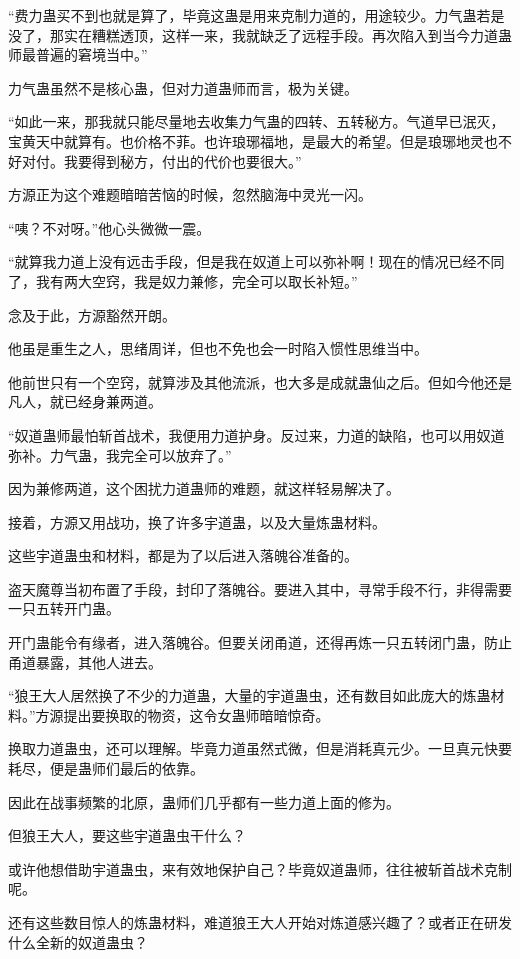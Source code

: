 \begin{this_body}
“费力蛊买不到也就是算了，毕竟这蛊是用来克制力道的，用途较少。力气蛊若是没了，那实在糟糕透顶，这样一来，我就缺乏了远程手段。再次陷入到当今力道蛊师最普遍的窘境当中。”

力气蛊虽然不是核心蛊，但对力道蛊师而言，极为关键。

“如此一来，那我就只能尽量地去收集力气蛊的四转、五转秘方。气道早已泯灭，宝黄天中就算有。也价格不菲。也许琅琊福地，是最大的希望。但是琅琊地灵也不好对付。我要得到秘方，付出的代价也要很大。”

方源正为这个难题暗暗苦恼的时候，忽然脑海中灵光一闪。

“咦？不对呀。”他心头微微一震。

“就算我力道上没有远击手段，但是我在奴道上可以弥补啊！现在的情况已经不同了，我有两大空窍，我是奴力兼修，完全可以取长补短。”

念及于此，方源豁然开朗。

他虽是重生之人，思绪周详，但也不免也会一时陷入惯性思维当中。

他前世只有一个空窍，就算涉及其他流派，也大多是成就蛊仙之后。但如今他还是凡人，就已经身兼两道。

“奴道蛊师最怕斩首战术，我便用力道护身。反过来，力道的缺陷，也可以用奴道弥补。力气蛊，我完全可以放弃了。”

因为兼修两道，这个困扰力道蛊师的难题，就这样轻易解决了。

接着，方源又用战功，换了许多宇道蛊，以及大量炼蛊材料。

这些宇道蛊虫和材料，都是为了以后进入落魄谷准备的。

盗天魔尊当初布置了手段，封印了落魄谷。要进入其中，寻常手段不行，非得需要一只五转开门蛊。

开门蛊能令有缘者，进入落魄谷。但要关闭甬道，还得再炼一只五转闭门蛊，防止甬道暴露，其他人进去。

“狼王大人居然换了不少的力道蛊，大量的宇道蛊虫，还有数目如此庞大的炼蛊材料。”方源提出要换取的物资，这令女蛊师暗暗惊奇。

换取力道蛊虫，还可以理解。毕竟力道虽然式微，但是消耗真元少。一旦真元快要耗尽，便是蛊师们最后的依靠。

因此在战事频繁的北原，蛊师们几乎都有一些力道上面的修为。

但狼王大人，要这些宇道蛊虫干什么？

或许他想借助宇道蛊虫，来有效地保护自己？毕竟奴道蛊师，往往被斩首战术克制呢。

还有这些数目惊人的炼蛊材料，难道狼王大人开始对炼道感兴趣了？或者正在研发什么全新的奴道蛊虫？


\end{this_body}
